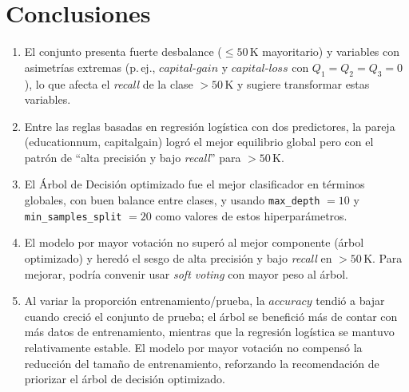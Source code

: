 \documentclass[12pt,a4paper]{article}
\begin{document}
\section{Conclusiones}
\begin{enumerate}
  \item El conjunto presenta fuerte desbalance (\(\leq 50\,\text{K}\) mayoritario) y variables con asimetrías 
  extremas (p.\,ej., \( \textit{capital-gain} \) y \( \textit{capital-loss} \) con \(Q_1=Q_2=Q_3=0\)), lo que afecta 
  el \emph{recall} de la clase \(>50\,\text{K}\) y sugiere transformar estas variables. 

  \item Entre las reglas basadas en regresión logística con dos predictores, la pareja (education\-num, 
  capital\-gain) logró el mejor equilibrio global pero con el patrón de “alta precisión y bajo \emph{recall}” 
  para \(>50\,\text{K}\).

  \item El Árbol de Decisión optimizado fue el mejor clasificador en términos globales, con buen balance entre clases, 
  y usando \texttt{max\_depth} \(=10\) y \texttt{min\_samples\_split} \(=20\) como valores de estos hiperparámetros. 

  \item El modelo por mayor votación no superó al mejor componente (árbol optimizado) y heredó el sesgo de alta precisión 
  y bajo \emph{recall} en \(>50\,\text{K}\). Para mejorar, podría convenir usar \emph{soft voting} con mayor peso al árbol.

  \item Al variar la proporción entrenamiento/prueba, la \(\textit{accuracy}\) tendió a bajar cuando creció el conjunto 
  de prueba; el árbol se benefició más de contar con más datos de entrenamiento, mientras que la regresión logística 
  se mantuvo relativamente estable. El modelo por mayor votación no compensó la reducción del tamaño de entrenamiento, reforzando la 
  recomendación de priorizar el árbol de decisión optimizado.
\end{enumerate}
\end{document}
